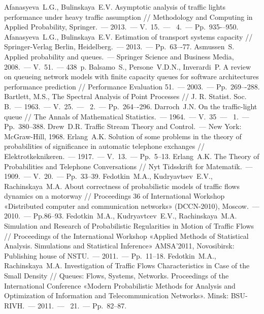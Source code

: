 \documentclass{report}
\newcommand{\No}{\textnumero}
\begin{document}
\begin{thebibliography}{99}
 Afanasyeva~L.G., Bulinskaya~E.V. Asymptotic analysis of traffic lights performance under heavy traffic assumption // Methodology and Computing in Applied Probability, Springer.~--- 2013.~--- V.~15.~--- \No{}~4.~--- Pp.~935-–950.
 Afanasyeva~L.G., Bulinskaya~E.V. Estimation of transport systems capacity // Springer-Verlag Berlin, Heidelberg.~--- 2013.~--- Pp.~63–-77.
 Asmussen~S. Applied probability and queues.~--- Springer Science and Business Media, 2008.~--- V.~51.~--- 438~p.
 Balsamo~S., Persone~V.D.N., Inverardi~P. A review on queueing network models with finite capacity queues for software architectures performance prediction // Performance Evaluation 51.~--- 2003.~--- Pp.~269–-288.
 Bartlett, M.S., The Spectral Analysis of Point Processes // J. R. Statist. Soc. B.~--- 1963.~--- V.~25.~--- \No{}~2.~--- Pp.~264–-296.
 Darroch~J.N. On the traffic-light queue // The Annals of Mathematical Statistics.~--- 1964.~--- V.~35~--- \No{}~1.~--- Pp.~380--388. 
 Drew~D.R. Traffic Stream Theory and Control.~--- New York: McGraw-Hill, 1968.
 Erlang~A.K. Solution of some problems in the theory of probabilities of significance in automatic telephone exchanges // Elektrotkeknikeren.~--- 1917.~--- V.~13.~--- Pp.~5--13.
 Erlang~A.K.  The Theory of Probabilities and Telephone Conversations //  Nyt Tidsskrift for Matematik.~--- 1909.~--- V.~20.~--- Pp.~33--39.
 Fedotkin~M.A., Kudryavtsev~E.V., Rachinskaya~M.A.  About correctness of probabilistic models of traffic flows dynamics on a motorway // Proceedings 36 of International Workshop «Distributed computer and communication networks» (DCCN-2010), Moscow.~--- 2010.~--- Pp.86--93.
 Fedotkin~M.A., Kudryavtcev~E.V., Rachinskaya~M.A. Simulation and Research of Probabilistic Regularities in Motion of Traffic Flows // Proceedings of the International Workshop «Applied Methods of Statistical Analysis. Simulations and
Statistical Inference» AMSA’2011, Novosibirsk: Publishing house of NSTU.~--- 2011.~--- Pp.~11--18.
 Fedotkin~M.A., Rachinskaya~M.A. Investigation of Traffic Flows Characteristics in Case of the Small Density // Queues: Flows, Systems, Networks. Proceedings of the International Conference «Modern Probabilistic Methods for Analysis and Optimization of Information and Telecommunication Networks». Minsk: BSU-RIVH.~--- 2011.~--- \No{}~21.~--- Pp.~82--87.

\end{thebibliography}
\end{document}
